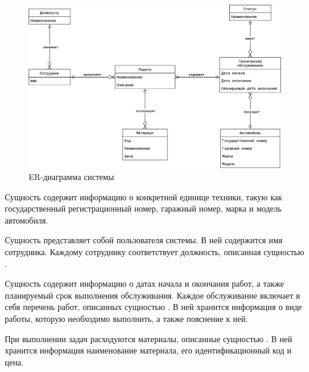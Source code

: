\documentclass[../nirs.tex]{subfiles}
\begin{document}
\clearpage
\begin{landscape}

\begin{figure}[hp!]
  \centering
  \includegraphics[keepaspectratio,
                   width=1.4\textwidth]{./images/er-2.png}
  \caption{ER-диаграмма системы}
  \label{fig:2_1_er_diagram}
\end{figure}

\end{landscape}
\clearpage

Сущность  содержит информацию о конкретной единице
техники, такую как государственный регистрационный номер, гаражный номер, марка
и модель автомобиля.

Сущность  представляет собой пользователя системы.
В ней содержится имя сотрудника. Каждому сотруднику соответствует должность,
описанная сущностью .

Сущность  содержит информацию о датах начала
и окончания работ, а также планируемый срок выполнения обслуживания. Каждое
обслуживание включает в себя перечень работ, описанных сущностью
. В ней хранится информация о виде работы, которую необходимо
выполнить, а также пояснение к ней.

При выполнении задач расходуются материалы, описанные сущностью
. В ней хранится информация наименование материала, его
идентификационный код и цена.
\end{document}
